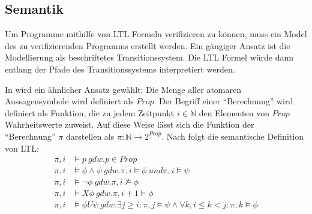 \subsection{Semantik}

Um Programme mithilfe von LTL Formeln verifizieren zu können, muss ein Model des zu verifizierenden Programms erstellt werden. Ein gängiger Ansatz ist die Modellierung als beschriftetes Transitionssystem\cite{huth+04}. Die LTL Formel würde dann entlang der Pfade des Transitionssystems interpretiert werden. 

In \cite{vardi+96} wird ein ähnlicher Ansatz gewählt: Die Menge aller atomaren Aussagensymbole wird definiert als $Prop$. Der Begriff einer "`Berechnung"' wird definiert als Funktion, die zu jedem Zeitpunkt $i \in \mathbb{N}$ den Elementen von $Prop$ Wahrheitswerte zuweist. Auf diese Weise lässt sich die Funktion der "`Berechnung"' $\pi$ darstellen als $\pi : \mathbb{N} \rightarrow 2^{Prop}$. Nach \cite{vardi+96} folgt die semantische Definition von LTL: 
\begin{equation*}
\begin{split}
    \pi, i &\models p\ gdw. p \in Prop\\
    \pi, i &\models \phi \land \psi\ gdw. \pi, i \models \phi\ und \pi, i \models \psi\\
    \pi, i &\models \lnot\phi\ gdw. \pi, i \not\models \phi\\
    \pi, i &\models X\phi\ gdw. \pi, i+1 \models \phi\\
    \pi, i &\models \phi U\psi\ gdw. {\exists j \geq i: \pi, j \models \psi \land \forall k, i\leq k<j: \pi, k \models \phi}
\end{split}
\end{equation*}
